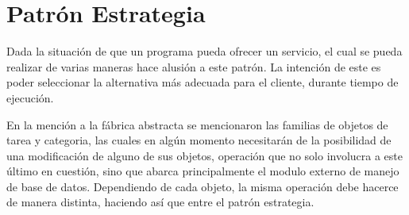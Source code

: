 \section{Patrón Estrategia}
Dada la situación de que un programa pueda ofrecer un servicio, el cual se pueda realizar de varias maneras hace alusión a este patrón. La intención de este es poder seleccionar la alternativa más adecuada para el cliente, durante tiempo de ejecución.

En la mención a la fábrica abstracta se mencionaron las familias de objetos de tarea y categoria, las cuales en algún momento necesitarán de la posibilidad de una modificación de alguno de sus objetos, operación que no solo involucra a este último en cuestión, sino que abarca principalmente el modulo externo de manejo de base de datos. Dependiendo de cada objeto, la misma operación debe hacerce de manera distinta, haciendo así que entre el patrón estrategia.

